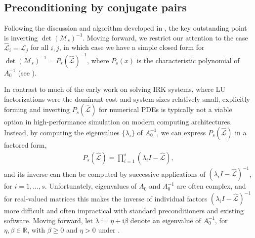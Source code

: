 \documentclass[review]{siamart}
\begin{document}
\subsection{Preconditioning by conjugate pairs}\label{sec:solve:prec}

Following the discussion and algorithm developed in , the key
outstanding point is inverting $\det(\mathcal{M}_s)^{-1}$. Moving forward, we
restrict our attention to the case $\widehat{\mathcal{L}}_i = \widehat{\mathcal{L}}_j$ for all $i,j$,
in which case we have a simple closed form for $\det(\mathcal{M}_s)^{-1} =
P_s(\widehat{\mathcal{L}})^{-1}$, where $P_s(x)$ is the characteristic polynomial
of $A_0^{-1}$ (see ).

In contrast to much of the early work on solving IRK systems, where LU factorizations
were the dominant cost and system sizes relatively small, explicitly forming and inverting
$P_s(\widehat{\mathcal{L}})$ for numerical PDEs is typically not a viable option in high-performance
simulation on modern computing architectures. Instead, by computing the eigenvalues
$\{\lambda_i\}$ of $A_0^{-1}$, we can express $P_s(\widehat{\mathcal{L}})$ in a factored form,
%
\begin{align}\label{eq:fac}
P_s(\widehat{\mathcal{L}}) = \prod_{i=1}^s (\lambda_i I - \widehat{\mathcal{L}}),
\end{align}
%
and its inverse can then be computed by successive applications of
$(\lambda_iI - \widehat{\mathcal{L}})^{-1}$,
for $i=1,...,s$. Unfortunately, eigenvalues of $A_0$ and $A_0^{-1}$ are often
complex, and for real-valued matrices this makes the inverse of individual factors
$(\lambda_iI - \widehat{\mathcal{L}})^{-1}$ more difficult and often impractical
with standard preconditioners and existing software. Moving forward, let
$\lambda := \eta + \mathrm{i}\beta$ denote an eigenvalue of $A_0^{-1}$,
for $\eta, \beta \in \mathbb{R}$, with $\beta \geq 0$ and $\eta > 0$ under .
\end{document}

